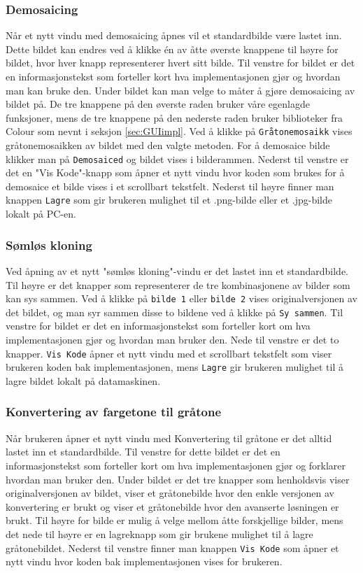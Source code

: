 \subsubsection{Demosaicing}
Når et nytt vindu med demosaicing åpnes vil et standardbilde være lastet inn. Dette bildet kan endres ved å klikke én av åtte øverste knappene til høyre for bildet, hvor hver knapp representerer hvert sitt bilde. Til venstre for bildet er det en informasjonstekst som forteller kort hva implementasjonen gjør og hvordan man kan bruke den. Under bildet kan man velge to måter å gjøre demosaicing av bildet på. De tre knappene på den øverste raden bruker våre egenlagde funksjoner, mens de tre knappene på den nederste raden bruker biblioteker fra Colour som nevnt i seksjon \ref{sec:GUIimpl}. Ved å klikke på \texttt{Gråtonemosaikk} vises gråtonemosaikken av bildet med den valgte metoden. For å demosaice bilde klikker man på \texttt{Demosaiced} og bildet vises i bilderammen. Nederst til venstre er det en "Vis Kode"-knapp som åpner et nytt vindu hvor koden som brukes for å demosaice et bilde vises i et scrollbart tekstfelt. Nederst til høyre finner man knappen \texttt{Lagre} som gir brukeren mulighet til et .png-bilde eller et .jpg-bilde lokalt på PC-en.

\subsubsection{Sømløs kloning}
Ved åpning av et nytt "sømløs kloning"-vindu er det lastet inn et standardbilde. Til høyre er det knapper som representerer de tre kombinasjonene av bilder som kan sys sammen. Ved å klikke på \texttt{bilde 1} eller \texttt{bilde 2} vises originalversjonen av det bildet, og man syr sammen disse to bildene ved å klikke på \texttt{Sy sammen}. Til venstre for bildet er det en informasjonstekst som forteller kort om hva implementasjonen gjør og hvordan man bruker den. Nede til venstre er det to knapper. \texttt{Vis Kode} åpner et nytt vindu med et scrollbart tekstfelt som viser brukeren koden bak implementasjonen, mens \texttt{Lagre} gir brukeren mulighet til å lagre bildet lokalt på datamaskinen.

\subsubsection{Konvertering av fargetone til gråtone}
Når brukeren åpner et nytt vindu med Konvertering til gråtone er det alltid lastet inn et standardbilde. Til venstre for dette bildet er det en informasjonstekst som forteller kort om hva implementasjonen gjør og forklarer hvordan man bruker den. Under bildet er det tre knapper som henholdsvis viser originalversjonen av bildet, viser et gråtonebilde hvor den enkle versjonen av konvertering er brukt og viser et gråtonebilde hvor den avanserte løsningen er brukt. Til høyre for bilde er mulig å velge mellom åtte forskjellige bilder, mens det nede til høyre er en lagreknapp som gir brukene mulighet til å lagre gråtonebildet. Nederst til venstre finner man knappen \texttt{Vis Kode} som åpner et nytt vindu hvor koden bak implementasjonen vises for brukeren.

